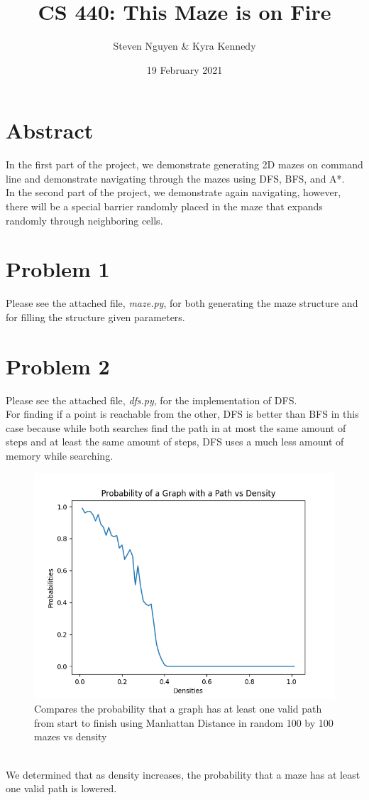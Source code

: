\documentclass[12pt]{report}
\title{CS 440: This Maze is on Fire}
\author{Steven Nguyen \& Kyra Kennedy}
\date{19 February 2021}
\begin{document}
\begin{titlepage}
\maketitle
\end{titlepage}

\section{Abstract}
In the first part of the project, we demonstrate generating 2D mazes on command line and demonstrate navigating through the mazes using DFS, BFS, and A*.\\
In the second part of the project, we demonstrate again navigating, however, there will be a special barrier randomly placed in the maze that expands randomly through neighboring cells.

\section{Problem 1}
Please see the attached file, \emph{maze.py}, for both generating the maze structure and for filling the structure given parameters.

\break
\section{Problem 2}
Please see the attached file, \emph{dfs.py}, for the implementation of DFS.\\
For finding if a point is reachable from the other, DFS is better than BFS in this case because while both searches find the path in at most the same amount of steps and at least the same amount of steps, DFS uses a much less amount of memory while searching.
\begin{figure}[h]
\includegraphics[width=\textwidth]{Probability of a Graph with Path vs Density.png}
\caption{Compares the probability that a graph has at least one valid path from start to finish using Manhattan Distance in random 100 by 100 mazes vs density}
\label{Probability of a Graph with a Complete Path vs Density}
\end{figure}\\
We determined that as density increases, the probability that a maze has at least one valid path is lowered.
\end{document}
